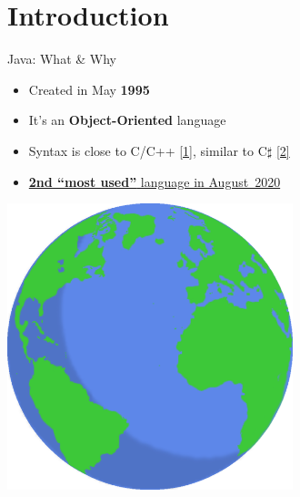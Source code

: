\documentclass[English,c,%
hyperref={%
    pdftitle={FISA-DE2 OOP in Java},%
    pdfauthor={Muller, Gravier, Laforest, Subercaze},%
    pdfsubject={OOP in Java},%
    pdfkeywords={OOP, Java},%
    colorlinks=true,%
    urlcolor=blue,%
    linkcolor=%
    },%
xcolor={pdftex,svgnames} %
]{beamer}
\begin{document}
\section{Introduction}

\begin{frame}{Java: What \& Why}
  \hspace{1cm}
  \begin{itemize}
    \item Created in May \textbf{1995}
    \vspace{1em}
    \item It's an \textbf{Object-Oriented} language %
    \vspace{1em}
    \item Syntax is close to C/C++ \href{https://en.wikipedia.org/wiki/Comparison_of_Java_and_C\%2B\%2B}{[1]}, similar to C$\sharp$ \href{https://en.wikipedia.org/wiki/Comparison_of_C_Sharp_and_Java}{[2]}
    \vspace{1em}
    \item \href{https://www.tiobe.com/tiobe-index/}{\textbf{2nd ``most used''} language in August~2020}
  \end{itemize}

  \begin{center}
    \includegraphics[height=8.3cm]{images01/earth1.png}
  \end{center}

\end{frame}
\end{document}
